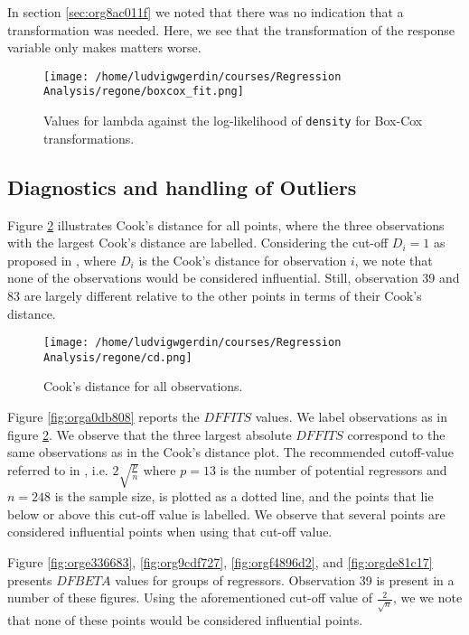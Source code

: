 \documentclass[11pt]{article}
\begin{document}
In section \ref{sec:org8ac011f} we noted that there was no indication that a transformation was needed. 
Here, we see that the transformation of the response variable only makes matters worse.

\begin{figure}[h]
\centering
\texttt{[image: /home/ludvigwgerdin/courses/Regression Analysis/regone/boxcox\_fit.png]}
\caption{\label{fig:org142a365}
Values for lambda against the log-likelihood of \texttt{density} for Box-Cox transformations.}
\end{figure}

\subsection{Diagnostics and handling of Outliers}
\label{sec:org6ad0667}

Figure \ref{fig:org2597dc1} illustrates Cook's distance for all points, where the three observations with the largest 
Cook's distance are labelled. Considering the cut-off \(D_i = 1\) as proposed in \cite{Montgomery2012}, 
where \(D_i\) is the Cook's distance for observation \(i\), we note that none of the observations would be 
considered influential. Still, observation 39 and 83 are largely different relative
to the other points in terms of their Cook's distance. 

\begin{figure}[h]
\centering
\texttt{[image: /home/ludvigwgerdin/courses/Regression Analysis/regone/cd.png]}
\caption{\label{fig:org2597dc1}
Cook's distance for all observations.}
\end{figure}

Figure \ref{fig:orga0db808} reports the \(DFFITS\) values. We label observations as in figure \ref{fig:org2597dc1}. We observe 
that the three largest absolute \(DFFITS\) correspond to the same observations as in the Cook's distance plot.
The recommended cutoff-value referred to in \cite{Montgomery2012}, i.e. \(2\sqrt{\frac{p}{n}}\)
where \(p = 13\) is the number of potential regressors and \(n = 248\) is the sample size, is 
plotted as a dotted line, and the points that lie below or above this cut-off value is labelled.
We observe that several points are considered influential points when using that cut-off value.

Figure \ref{fig:orge336683}, \ref{fig:org9cdf727}, \ref{fig:orgf4896d2}, and
\ref{fig:orgde81c17} presents \(DFBETA\) values for groups of regressors. Observation 39
is present in a number of these figures. Using the aforementioned cut-off value of \(\frac{2}{\sqrt{n}}\), we 
we note that none of these points would be considered influential points.
\end{document}
